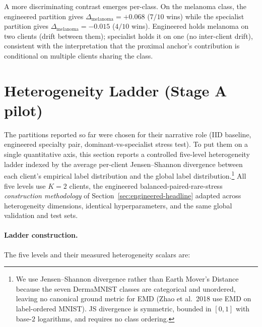 \documentclass[11pt,a4paper]{report}
\begin{document}
A more discriminating contrast emerges per-class. On the melanoma
class, the engineered partition gives $\Delta_{\mathrm{melanoma}} =
+0.068$ ($7/10$ wins) while the specialist partition gives
$\Delta_{\mathrm{melanoma}} = -0.015$ ($4/10$ wins). Engineered
holds melanoma on two clients (drift between them); specialist
holds it on one (no inter-client drift), consistent with the
interpretation that the proximal anchor's contribution is
conditional on multiple clients sharing the class.


\section{Heterogeneity Ladder (Stage A pilot)}
\label{sec:heterogeneity-ladder}

The partitions reported so far were chosen for their narrative role
(IID baseline, engineered specialty pair, dominant-vs-specialist
stress test). To put them on a single quantitative axis, this
section reports a controlled five-level heterogeneity ladder
indexed by the average per-client Jensen--Shannon divergence
between each client's empirical label distribution and the global
label distribution.\footnote{We use Jensen--Shannon divergence
rather than Earth Mover's Distance because the seven DermaMNIST
classes are categorical and unordered, leaving no canonical ground
metric for EMD (Zhao et al.\ 2018 use EMD on label-ordered MNIST).
JS divergence is symmetric, bounded in $[0, 1]$ with base-$2$
logarithms, and requires no class ordering.}
All five levels use $K = 2$ clients, the engineered
balanced-paired-rare-stress \emph{construction methodology} of
Section~\ref{sec:engineered-headline} adapted across heterogeneity
dimensions, identical hyperparameters, and the same global
validation and test sets.

\paragraph{Ladder construction.}
The five levels and their measured heterogeneity scalars are:
\end{document}
